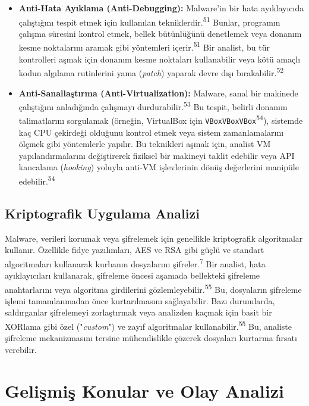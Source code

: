 \begin{itemize}
    \item \textbf{Anti-Hata Ayıklama (Anti-Debugging):} Malware'in bir hata ayıklayıcıda çalıştığını tespit etmek için kullanılan tekniklerdir.\textsuperscript{51} Bunlar, programın çalışma süresini kontrol etmek, bellek bütünlüğünü denetlemek veya donanım kesme noktalarını aramak gibi yöntemleri içerir.\textsuperscript{51} Bir analist, bu tür kontrolleri aşmak için donanım kesme noktaları kullanabilir veya kötü amaçlı kodun algılama rutinlerini yama (\textit{patch}) yaparak devre dışı bırakabilir.\textsuperscript{52}
    \item \textbf{Anti-Sanallaştırma (Anti-Virtualization):} Malware, sanal bir makinede çalıştığını anladığında çalışmayı durdurabilir.\textsuperscript{53} Bu tespit, belirli donanım talimatlarını sorgulamak (örneğin, VirtualBox için \texttt{VBoxVBoxVBox}\textsuperscript{54}), sistemde kaç CPU çekirdeği olduğunu kontrol etmek veya sistem zamanlamalarını ölçmek gibi yöntemlerle yapılır. Bu teknikleri aşmak için, analist VM yapılandırmalarını değiştirerek fiziksel bir makineyi taklit edebilir veya API kancalama (\textit{hooking}) yoluyla anti-VM işlevlerinin dönüş değerlerini manipüle edebilir.\textsuperscript{54}
\end{itemize}

\subsection{Kriptografik Uygulama Analizi}

Malware, verileri korumak veya şifrelemek için genellikle kriptografik algoritmalar kullanır. Özellikle fidye yazılımları, AES ve RSA gibi güçlü ve standart algoritmaları kullanarak kurbanın dosyalarını şifreler.\textsuperscript{7} Bir analist, hata ayıklayıcıları kullanarak, şifreleme öncesi aşamada bellekteki şifreleme anahtarlarını veya algoritma girdilerini gözlemleyebilir.\textsuperscript{55} Bu, dosyaların şifreleme işlemi tamamlanmadan önce kurtarılmasını sağlayabilir. Bazı durumlarda, saldırganlar şifrelemeyi zorlaştırmak veya analizden kaçmak için basit bir XORlama gibi özel ("\textit{custom}") ve zayıf algoritmalar kullanabilir.\textsuperscript{55} Bu, analiste şifreleme mekanizmasını tersine mühendislikle çözerek dosyaları kurtarma fırsatı verebilir.

\section{Gelişmiş Konular ve Olay Analizi}


